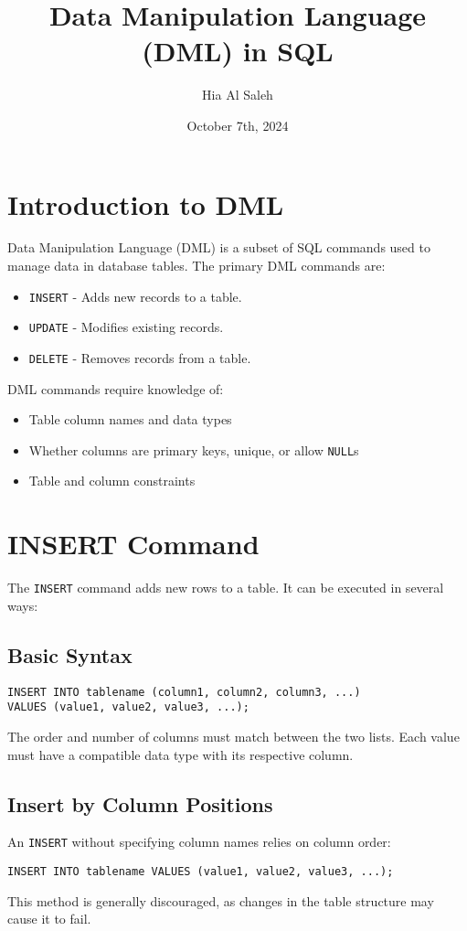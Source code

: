 \documentclass{article}
\begin{document}
\title{Data Manipulation Language (DML) in SQL}
\author{Hia Al Saleh}
\date{October 7th, 2024}
\maketitle
\tableofcontents
\newpage

\section{Introduction to DML}
Data Manipulation Language (DML) is a subset of SQL commands used to manage data in database tables. The primary DML commands are:
\begin{itemize}
    \item \texttt{INSERT} - Adds new records to a table.
    \item \texttt{UPDATE} - Modifies existing records.
    \item \texttt{DELETE} - Removes records from a table.
\end{itemize}

DML commands require knowledge of:
\begin{itemize}
    \item Table column names and data types
    \item Whether columns are primary keys, unique, or allow \texttt{NULL}s
    \item Table and column constraints
\end{itemize}

\section{INSERT Command}
The \texttt{INSERT} command adds new rows to a table. It can be executed in several ways:
\subsection{Basic Syntax}
\begin{verbatim}
INSERT INTO tablename (column1, column2, column3, ...)
VALUES (value1, value2, value3, ...);
\end{verbatim}
The order and number of columns must match between the two lists. Each value must have a compatible data type with its respective column.

\subsection{Insert by Column Positions}
An \texttt{INSERT} without specifying column names relies on column order:
\begin{verbatim}
INSERT INTO tablename VALUES (value1, value2, value3, ...);
\end{verbatim}
This method is generally discouraged, as changes in the table structure may cause it to fail.
\end{document}
